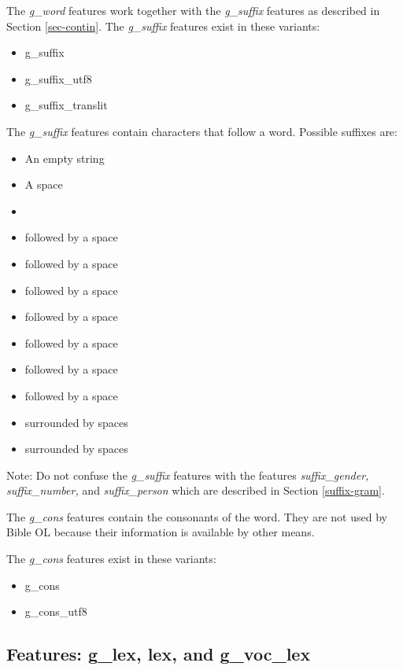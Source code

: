 \documentclass[11pt,oneside,a4paper]{memoir}
\newcommand{\heb}[1]{{\RL {\ezr #1}}}
\begin{document}
The \emph{g\_word} features work together with the \emph{g\_suffix} features as
described in Section \ref{sec-contin}. The \emph{g\_suffix} features exist in these variants:

\begin{itemize}
\item g\_suffix
\item g\_suffix\_utf8
\item g\_suffix\_translit
\end{itemize}

The \emph{g\_suffix} features contain characters that follow a word. Possible suffixes are:

\begin{itemize}
\item An empty string
\item A space
\item \heb{־}
\item \heb{׀}\quad followed by a space
\item \heb{׃}\quad followed by a space
\item \heb{׃ ׆}\quad followed by a space
\item \heb{׃ ׆ ס}\quad followed by a space
\item \heb{׃ ׆ פ}\quad followed by a space
\item \heb{׃ ס}\quad followed by a space
\item \heb{׃ פ}\quad followed by a space
\item \heb{ס}\quad surrounded by spaces
\item \heb{פ}\quad surrounded by spaces 
\end{itemize}

Note: Do not confuse the \emph{g\_suffix} features with the features \emph{suffix\_gender,} \emph{suffix\_number,} and
\emph{suffix\_person} which are described in Section \ref{suffix-gram}.


The \emph{g\_cons} features contain the consonants of the word. They are not used by Bible OL
because their information is available by other means.

The \emph{g\_cons} features exist in these variants:

\begin{itemize}
\item g\_cons
\item g\_cons\_utf8
\end{itemize}


\subsection{Features: g\_lex, lex, and g\_voc\_lex}
\end{document}
